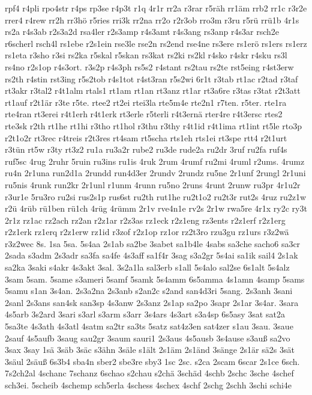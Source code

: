 {rpf4
r4pli
rpo4str
r4ps
rp3se
r4p3t
r1q
4r1r
rr2a
r3rar
r5räh
rr1äm
rrb2
rr1c
r3r2e
rrer4
r4rew
rr2h
rr3hö
r5ries
rri3k
rr2na
rr2o
r2r3ob
rro3m
r3ru
r5rü
rrü1b
4r1s
rs2a
r4s3ab
r2s3a2d
rsa4ler
r2s3amp
r4s3amt
r4s3ang
rs3anp
r4s3ar
rsch2e
r6scherl
rsch4l
rs1ebe
r2s1ein
rse3le
rse2n
rs2end
rse4ne
rs3ere
rs1erö
rs1ers
rs1erz
rs1eta
r3sho
r3si
rs2ka
r5skal
r5skan
rs3kat
rs2ki
rs2kl
r4sko
r4skr
r4sku
rs3l
rs4no
r2s1op
r4s3ort.
r3s2p
r4s3ph
rs5s2
r4stant
rs2tau
rs2te
rst5eing
r4st3erw
rs2th
r4stin
rst3ing
r5s2tob
r4s1tot
r4st3ran
r5s2wi
6r1t
r3tab
rt1ac
r2tad
r3taf
rt3akr
r3tal2
r4t1alm
rtals1
rt1am
rt1an
rt3anz
rt1ar
rt3a6re
r3tas
r3tat
r2t3att
rt1auf
r2t1är
r3te
r5te.
rtee2
rt2ei
rtei3la
rte5m4e
rte2n1
r7ten.
r5ter.
rte1ra
rte4ran
rt3erei
r4t1erh
r4t1erk
rt3erle
r5terli
r4t3ernä
rter4re
r4t3ersc
rtes2
rte3sk
r2th
rt1he
rt1hi
r3tho
rt1hol
r3thu
r3thy
r4t1id
r4t1ima
rt1int
rt5le
rto3p
r2t1o2r
rt3rec
r4treis
r2t3res
rt4sam
rt5scha
rts1eh
rts1ei
rt3spe
rtt4
r2t1urt
r3tün
rt5w
r3ty
rt3z2
ru1a
ru3a2r
rube2
ru3de
rude2a
ru2dr
3ruf
ru2fa
ruf4s
ruf5sc
4rug
2ruhr
5ruin
ru3ins
ru1is
4ruk
2rum
4rumf
ru2mi
4ruml
r2ums.
4rumz
ru4n
2r1una
run2d1a
2rundd
run4d3er
2rundv
2rundz
ru5ne
2r1unf
2rungl
2r1uni
ru5nis
4runk
run2kr
2r1unl
r1unm
4runn
ru5no
2runs
4runt
2runw
ru3pr
4r1u2r
r3ur1e
5ru3ro
ru2si
rus2s1p
rus6st
ru2th
rut1he
ru2t1o2
ru2t3r
rut2s
4ruz
ru2z1w
r2ü
4rüb
rü1ben
rü1ch
4rüg
4rümm
2r1v
rve4n1e
rv2s
2r1w
rwa5re
4r1x
ry2c
ry3t
2r1z
rz1ac
rz2ach
rz2an
r2z1ar
r2z3as
rz1eck
r2z1eng
rz3ents
r2z1erf
r2z1erg
r2z1erk
rz1erq
r2z1erw
rz1id
r3zof
r2z1op
rz1or
rz2t3ro
rzu3gu
rz1urs
r3z2wä
r3z2wec
8s.
1sa
5sa.
5s4aa
2s1ab
sa2be
3sabet
sa1b4le
4sabs
sa3che
sacho6
sa3cr
2sada
s3adm
2s3adr
sa3fa
sa4fe
4s3aff
sa1f4r
3sag
s3a2gr
5s4ai
sa1ik
sail4
2s1ak
sa2ka
3saki
s4akr
4s3akt
3sal.
3s2a1la
sal3erb
s1all
5s4alo
sal2se
6s1alt
5s4alz
3sam
5sam.
5same
s3ameri
5samf
5samk
5s4amm
6s5amma
4s1amn
4samp
5sams
5samu
s1an
3s4an.
2s3a2na
2s3anb
s2an2c
s2and
san4d3ri
5sang.
2s3anh
3sani
2sanl
2s3ans
san4sk
san3sp
4s3anw
2s3anz
2s1ap
sa2po
3sapr
2s1ar
3s4ar.
3sara
4s5arb
3s2ard
3sari
s3arl
s3arm
s3arr
3s4ars
4s3art
s3a4sp
6s5asy
3sat
sat2a
5sa3te
4s3ath
4s3atl
4satm
sa2tr
sa3ts
5satz
sat4z3en
sat4zer
s1au
3sau.
3saue
2sauf
4s5aufb
3saug
sau2gr
3saum
sauri1
2s3aus
4s5ausb
3s4ause
s3auß
sa2vo
3sax
3say
1sä
3säb
3säc
s3ähn
3säle
s1ält
2s1äm
2s1änd
3sänge
2s1är
sä2s
3sät
3säul
2säuß
6s3b4
sba4n
sber2
sbe3re
sby3
1sc
2sc.
s2ca
2scam
6scar
2s1ce
6sch.
7s2ch2al
4schanc
7schanz
6schao
s2chau
s2chä
3schäd
4schb
2schc
3sche
4schef
sch3ei.
5scheib
4schemp
sch5erla
4schess
4schex
4schf
2schg
2schh
3schi
schi4e
}
